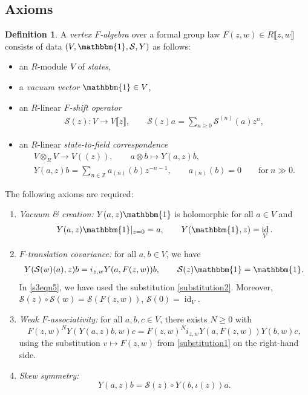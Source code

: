 \documentclass[10pt,a4paper]{amsart}
\numberwithin{equation}{section}
\theoremstyle{definition}
\newtheorem{Definition}[Theorem]{Definition}
\DeclareMathOperator\id{id}
\def\lb{\llbracket}
\def\rb{\rrbracket}
\begin{document}
\subsection{Axioms}
\label{s41}

\begin{Definition}
\label{s3dfn1}
A \emph{vertex $F$-algebra} over a formal group law $F(z,w)\in R\lb z,w\rb$ consists of data $(V,\mathbbm{1},\mathcal{S},Y)$ as follows:
\begin{itemize}\itemsep=0pt
\item
an $R$-module $V$ of \emph{states},
\item
a \emph{vacuum vector} $\mathbbm{1}\in V$,
\item
an $R$-linear \emph{$F$-shift operator}
\begin{align}
\label{F-shift}
\mathcal{S}(z)\colon V \longrightarrow V\lb z\rb,\qquad
\mathcal{S}(z)a=\sum_{n\geqslant0} \mathcal{S}^{(n)}(a)z^n,
\end{align}
\item
an $R$-linear \emph{state-to-field correspondence}
\begin{gather}%
 V\otimes_R V \longrightarrow V(\!( z)\!),\qquad a\otimes b\longmapsto Y(a,z)b,\nonumber\\
 \label{s3eqn10}
 Y(a,z)b = \sum_{n\in\mathbb{Z}} a_{(n)}(b)z^{-n-1},\qquad a_{(n)}(b)=0\qquad \text{for} \ n\gg 0.
\end{gather}
\end{itemize}
The following axioms are required:
\begin{enumerate}\itemsep=0pt
	\item[$(1)$] \emph{Vacuum \& creation:} $Y(a,z)\mathbbm{1}$ is holomorphic for all $a\in V$ and
	\begin{align}%
	 Y(a,z)\mathbbm{1} |_{z=0} = a,\qquad
 Y(\mathbbm{1},z) = \id_V.\label{s3eqn4}
	\end{align}
	\item[$(2)$] {\it $F$-translation covariance:} for all $a, b \in V$, we have
	\begin{align}%
	 Y(\mathcal{S}(w)(a),z)b = i_{z,w} Y(a, F(z,w))b,\qquad
	 \mathcal{S}(z)\mathbbm{1} = \mathbbm{1}.\label{s3eqn5}
	\end{align}
	In \eqref{s3eqn5}, we have used the substitution \eqref{substitution2}. Moreover,
	$\mathcal{S}(z)\circ\mathcal{S}(w) =\mathcal{S}(F(z,w))$,
	$\mathcal{S}(0)=\id_V$.
	\item[$(3)$] \emph{Weak $F$-associativity:} for all $a,b,c \in V$, there exists $N \geqslant 0$ with
 \begin{equation}
 \label{s3eqn7}
 F(z,w)^N Y(Y(a,z)b,w)c = F(z,w)^N i_{z,w} Y(a, F(z,w)) Y(b,w) c,
 \end{equation}
 using the substitution $v\mapsto F(z,w)$ from \eqref{substitution1} on the right-hand side.
 \item[$(4)$] \emph{Skew symmetry:}
 \begin{equation}
 \label{s3eqn8}
 Y(a,z)b =\mathcal{S}(z) \circ Y(b, \iota(z))a.
 \end{equation}
\end{enumerate}
\end{Definition}
\end{document}
